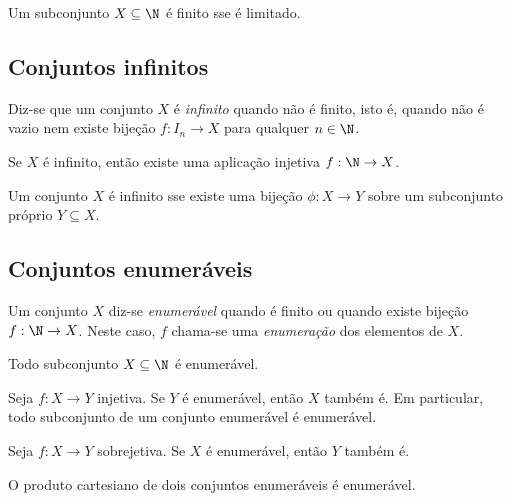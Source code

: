 \documentclass{article}
\begin{document}
\begin{cor}
    Um subconjunto \(X \subseteq \N\) é finito sse é limitado.
\end{cor}

\subsection{Conjuntos infinitos}

\begin{defn}
    Diz-se que um conjunto \(X\) é \emph{infinito} quando não é finito, isto é, quando não é vazio nem existe bijeção \(f: I_n \to X\) para qualquer \(n \in \N\).
\end{defn}

\begin{thm}
    Se \(X\) é infinito, então existe uma aplicação injetiva \(f: \N \to X\).
\end{thm}

\begin{cor}
    Um conjunto \(X\) é infinito sse existe uma bijeção \(\phi: X \to Y\) sobre um subconjunto próprio \(Y \subseteq X\).
\end{cor}

\subsection{Conjuntos enumeráveis}

\begin{defn}
    Um conjunto \(X\) diz-se \emph{enumerável} quando é finito ou quando existe bijeção \(f: \N \to X\). Neste caso, \(f\) chama-se uma \emph{enumeração} dos elementos de \(X\).
\end{defn}

\begin{thm}
    Todo subconjunto \(X \subseteq \N\) é enumerável.
\end{thm}

\begin{cor}
    Seja \(f: X \to Y\) injetiva. Se \(Y\) é enumerável, então \(X\) também é. Em particular, todo subconjunto de um conjunto enumerável é enumerável.
\end{cor}

\begin{cor}
    Seja \(f: X \to Y\) sobrejetiva. Se \(X\) é enumerável, então \(Y\) também é.
\end{cor}

\begin{cor}
    O produto cartesiano de dois conjuntos enumeráveis é enumerável.
\end{cor}
\end{document}
